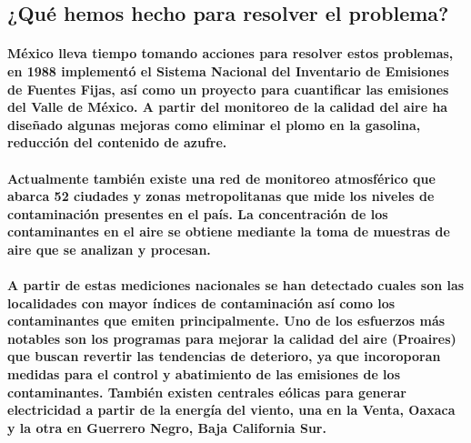   \subsection {¿Qué hemos hecho para resolver el problema?}
    \paragraph {México lleva tiempo tomando acciones para resolver estos problemas, en 1988 implementó el Sistema Nacional del Inventario de Emisiones de Fuentes Fijas, así como un proyecto para cuantificar las emisiones del Valle de México. A partir del monitoreo de la calidad del aire ha diseñado algunas mejoras como eliminar el plomo en la gasolina, reducción del contenido de azufre.}

    \paragraph {Actualmente también existe una red de monitoreo atmosférico que abarca 52 ciudades y zonas metropolitanas que mide los niveles de contaminación presentes en el país. La concentración de los contaminantes en el aire se obtiene mediante la toma de muestras de aire que se analizan y procesan.}

    \paragraph {A partir de estas mediciones nacionales se han detectado cuales son las localidades con mayor índices de contaminación así como los contaminantes que emiten principalmente.  Uno de los esfuerzos más notables son los programas para mejorar la calidad del aire (Proaires) que buscan revertir las tendencias de deterioro, ya que incoroporan medidas para el control y abatimiento de las emisiones de los contaminantes.  También existen centrales eólicas para generar electricidad a partir de la energía del viento, una en la Venta, Oaxaca y la otra en Guerrero Negro, Baja California Sur.}